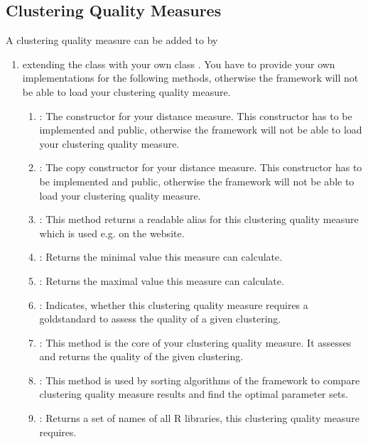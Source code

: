 	\subsection{Clustering Quality Measures}\label{subsec_extend_qualitymeasures}
	A clustering quality measure  can be added to \clusteval by
	\begin{enumerate}
		\item extending the class  with your own class . You have to provide your own implementations for the following methods, otherwise the framework will not be able to load your clustering quality measure.
		\begin{enumerate}
			\item {}: The constructor for your distance measure. This constructor has to be implemented and public, otherwise the framework will not be able to load your clustering quality measure.
			\item {}: The copy constructor for your distance measure. This constructor has to be implemented and public, otherwise the framework will not be able to load your clustering quality measure.
			\item {}: This method returns a readable alias for this clustering quality measure which is used e.g. on the website.
			\item {}: Returns the minimal value this measure can calculate.
			\item {}: Returns the maximal value this measure can calculate.
			\item {}: Indicates, whether this clustering quality measure requires a goldstandard to assess the quality of a given clustering.
			\item {}: This method is the core of your clustering quality measure. It assesses and returns the quality of the given clustering.
			\item {}: This method is used by sorting algorithms of the framework to compare clustering quality measure results and find the optimal parameter sets.
			\item {}: Returns a set of names of all R libraries, this clustering quality measure requires.
		\end{enumerate}
		

\end{enumerate}

